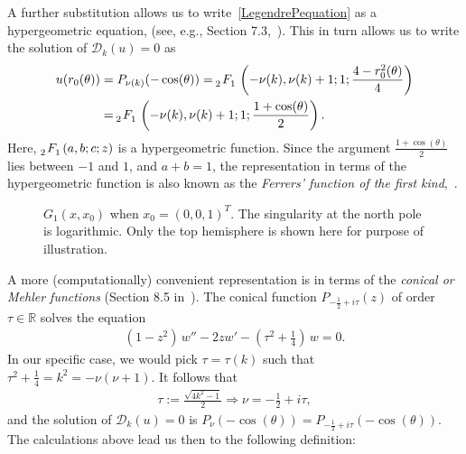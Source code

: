 A further substitution allows us to write~\eqref{LegendrePequation} as
a hypergeometric equation, (see, e.g., Section 7.3,~\cite{lebedev}).
This in turn allows us to write the solution of $\mathcal{D}_k(u)=0$ as 
\begin{align*} 
  u(r_0(\theta)) &= P_{\nu(k)}(-\cos(\theta)) = 
    \tensor[_2]{F}{_1}\left(-\nu(k), \nu(k)+  1; 1; 
      \frac{4-r_0^2(\theta)}{4}\right) \\
    &=\tensor[_2]{F}{_1}\left(-\nu(k), \nu(k)+  1; 1;
    \frac{1+\cos(\theta)}{2}\right).
\end{align*} 
Here, $\tensor[_2]{F}{_1}(a,b;c;z)$ is a hypergeometric function. Since
the argument $\frac{1+\cos(\theta)}{2}$ lies between $-1$ and $1$, and
$a+b = 1$, the representation in terms of the hypergeometric function is
also known as the {\it Ferrers' function of the first
kind},~\cite{fatAbramowitz}. 

\begin{figure}
  \centering
  
  \caption{\label{f:greensFun} $G_1(x,x_0)$ when $x_0=(0,0,1)^T$. The
  singularity at the north pole is logarithmic. Only the top hemisphere
  is shown here for purpose of illustration.}
\end{figure}
A more (computationally) convenient representation is in terms of the
{\it conical or Mehler functions} (Section 8.5 in~\cite{lebedev}). The
conical function $P_{-\frac{1}{2}+ i \tau}(z)$ of order $\tau\in
\mathbb{R}$ solves the equation
\begin{align*}
  (1-z^2)\,w'' -2zw' - \left( \tau^2+\frac{1}{4}\right) \,w = 0.
\end{align*}
In our specific case, we would pick $\tau = \tau(k)$ such that
$\tau^2+\frac{1}{4}=k^2 = -\nu(\nu+1).$  It follows that 
\begin{align*}
  \tau:=\frac{\sqrt{4k^2-1}}{2} \Rightarrow  \nu= -\frac{1}{2}+i\tau, 
\end{align*}
and the solution of $\mathcal{D}_k(u)=0$ is $
  P_{\nu} (-\cos(\theta)) = P_{-\frac{1}{2} + i \tau} 
    (-\cos(\theta)).$
The calculations above lead us then to the following definition:

